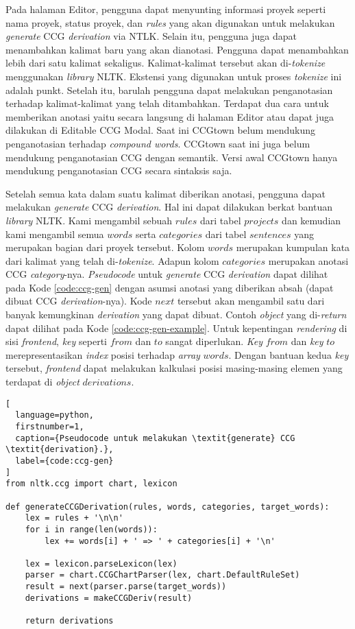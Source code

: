 Pada halaman Editor, pengguna dapat menyunting informasi proyek seperti nama proyek,
status proyek, dan \textit{rules} yang akan digunakan untuk melakukan \textit{generate}
CCG \textit{derivation} via NTLK. Selain itu, pengguna juga dapat menambahkan kalimat
baru yang akan dianotasi. Pengguna dapat menambahkan lebih dari satu kalimat sekaligus.
Kalimat-kalimat tersebut akan di-\textit{tokenize} menggunakan \textit{library} NLTK.
Ekstensi yang digunakan untuk proses \textit{tokenize} ini adalah punkt.
Setelah itu, barulah pengguna dapat melakukan penganotasian terhadap kalimat-kalimat yang
telah ditambahkan. Terdapat dua cara untuk memberikan anotasi yaitu secara langsung di
halaman Editor atau dapat juga dilakukan di Editable CCG Modal.
Saat ini CCGtown belum mendukung penganotasian terhadap \textit{compound words}.
CCGtown saat ini juga belum mendukung penganotasian CCG dengan semantik.
Versi awal CCGtown hanya mendukung penganotasian CCG secara sintaksis saja.

Setelah semua kata dalam suatu kalimat diberikan anotasi, pengguna dapat melakukan
\textit{generate} CCG \textit{derivation}. Hal ini dapat dilakukan berkat bantuan
\textit{library} NLTK. Kami mengambil sebuah $rules$ dari tabel $projects$ dan kemudian
kami mengambil semua $words$ serta $categories$ dari tabel $sentences$ yang merupakan
bagian dari proyek tersebut. Kolom $words$ merupakan kumpulan kata dari kalimat yang telah
di-\textit{tokenize}. Adapun kolom $categories$ merupakan anotasi CCG \textit{category}-nya.
\textit{Pseudocode} untuk \textit{generate} CCG \textit{derivation} dapat dilihat pada
Kode \ref{code:ccg-gen} dengan asumsi anotasi yang diberikan absah (dapat dibuat CCG
\textit{derivation}-nya). Kode $next$ tersebut akan mengambil satu dari banyak
kemungkinan \textit{derivation} yang dapat dibuat. Contoh \textit{object} yang
di-\textit{return} dapat dilihat pada Kode \ref{code:ccg-gen-example}.
Untuk kepentingan \textit{rendering} di sisi \textit{frontend}, \textit{key} seperti
$from$ dan $to$ sangat diperlukan. \textit{Key} $from$ dan \textit{key} $to$
merepresentasikan \textit{index} posisi terhadap \textit{array} $words$.
Dengan bantuan kedua \textit{key} tersebut, \textit{frontend} dapat melakukan kalkulasi
posisi masing-masing elemen yang terdapat di \textit{object} $derivations$.

\begin{lstlisting}[
  language=python,
  firstnumber=1,
  caption={Pseudocode untuk melakukan \textit{generate} CCG \textit{derivation}.},
  label={code:ccg-gen}
]
from nltk.ccg import chart, lexicon

def generateCCGDerivation(rules, words, categories, target_words):
    lex = rules + '\n\n'
    for i in range(len(words)):
        lex += words[i] + ' => ' + categories[i] + '\n'

    lex = lexicon.parseLexicon(lex)
    parser = chart.CCGChartParser(lex, chart.DefaultRuleSet)
    result = next(parser.parse(target_words))
    derivations = makeCCGDeriv(result)

    return derivations
\end{lstlisting}

